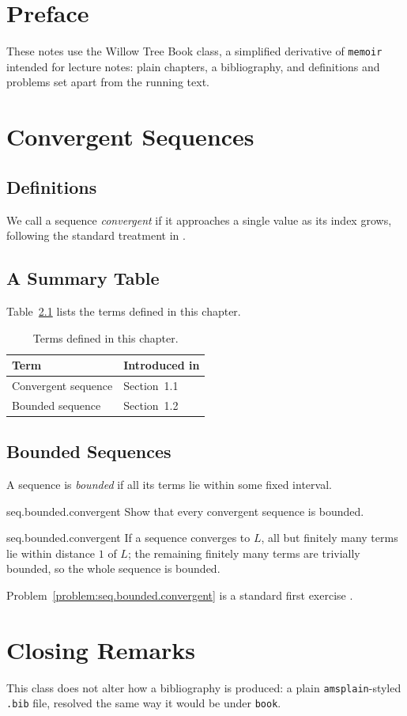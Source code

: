\documentclass{willowtreebook}
\begin{document}
\chapter{Preface}
These notes use the Willow Tree Book class, a simplified derivative of
\texttt{memoir} intended for lecture notes: plain chapters, a bibliography,
and definitions and problems set apart from the running text.
\afterpreface

\chapter{Convergent Sequences}

\section{Definitions}

We call a sequence \emph{convergent} if it
approaches a single value as its index grows, following the standard
treatment in \cite{knuth1984texbook}.

\section{A Summary Table}

Table~\ref{tab:terms} lists the terms defined in this chapter.

\begin{table}[h]
  \centering
  \begin{tabular}{ll}
    \toprule
    Term & Introduced in \\
    \midrule
    Convergent sequence & Section~1.1 \\
    Bounded sequence     & Section~1.2 \\
    \bottomrule
  \end{tabular}
  \caption{Terms defined in this chapter.}
  \label{tab:terms}
\end{table}

\section{Bounded Sequences}

A sequence is \emph{bounded} if all its terms lie
within some fixed interval.

\begin{problem}{seq.bounded.convergent}
Show that every convergent sequence is bounded.
\end{problem}
\begin{answer}{seq.bounded.convergent}
If a sequence converges to \(L\), all but finitely many terms lie within
distance \(1\) of \(L\); the remaining finitely many terms are trivially
bounded, so the whole sequence is bounded.
\end{answer}

Problem~\ref{problem:seq.bounded.convergent} is a standard first exercise
\cite{knuth1984texbook}.

\chapter{Closing Remarks}

This class does not alter how a bibliography is produced: a plain
\texttt{amsplain}-styled \texttt{.bib} file, resolved the same way it would
be under \texttt{book}.
\end{document}
